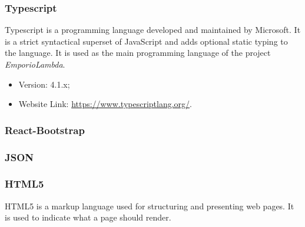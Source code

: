 \subsubsection{Typescript}
Typescript is a programming language developed and maintained by Microsoft. It is a strict syntactical superset of JavaScript and adds optional static typing to the language. It is used as the main programming language of the project \textit{EmporioLambda}.
\begin{itemize}
\item Version: 4.1.x;
\item Website Link: \url{https://www.typescriptlang.org/}.
\end{itemize}


\subsubsection{React-Bootstrap}


\subsubsection{JSON}


\subsubsection{HTML5}
HTML5 is a markup language used for structuring and presenting web pages. It is used to indicate what a page should render.
